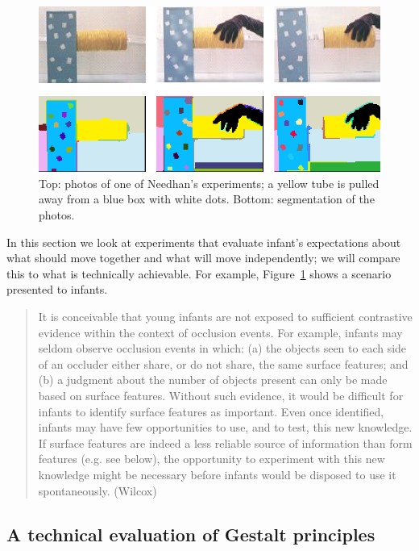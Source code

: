 \begin{figure}

\centerline{\includegraphics[width=0.5\columnwidth]{fig-pull}}

\caption{
Top: photos of one of Needhan's experiments; a yellow tube is 
pulled away from a blue box with white dots.
Bottom: segmentation of the photos.
}

\label{fig:move-apart}

\end{figure}

In this section we look at experiments that evaluate infant's
expectations about what should move together and what will move
independently; we will compare this to what is technically achievable.
For example, Figure~\ref{fig:move-apart} shows a scenario presented to
infants.



\begin{quote}

It is conceivable that young infants are not exposed to sufficient
contrastive evidence within the context of occlusion events. For
example, infants may seldom observe occlusion events in which: (a) the
objects seen to each side of an occluder either share, or do not
share, the same surface features; and (b) a judgment about the number
of objects present can only be made based on surface features. Without
such evidence, it would be difficult for infants to identify surface
features as important. Even once identified, infants may have few
opportunities to use, and to test, this new knowledge. If surface
features are indeed a less reliable source of information than form
features (e.g. see below), the opportunity to experiment with this new
knowledge might be necessary before infants would be disposed to use
it spontaneously. (Wilcox)

\end{quote}





\subsection{A technical evaluation of Gestalt principles}

